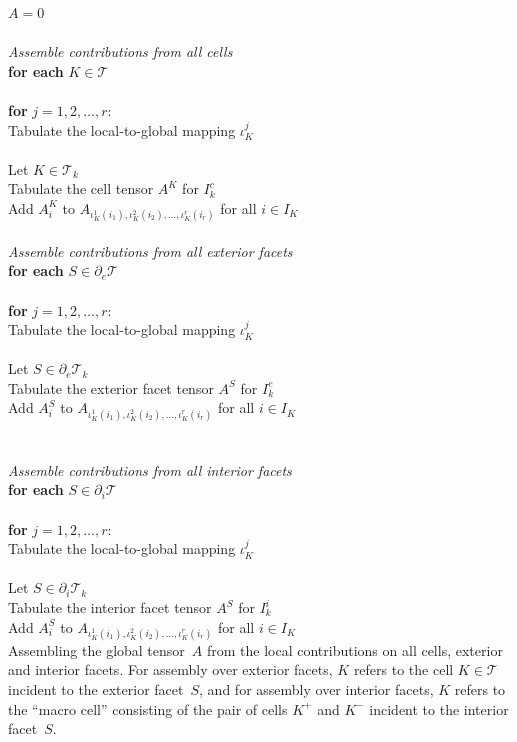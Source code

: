 \begin{algorithm}
$A = 0$ \\
\\
\emph{Assemble contributions from all cells} \\
\textbf{for each} $K \in \mathcal{T}$ \\
\\
\tab \textbf{for} $j = 1,2,\ldots,r$: \\
\tab\tab Tabulate the local-to-global mapping $\iota_K^j$ \\
\\
\tab Let $K \in \mathcal{T}_k$ \\
\tab Tabulate the cell tensor $A^K$ for $I^c_k$ \\
\tab Add $A^K_i$ to $A_{\iota_K^1(i_1), \iota_K^2(i_2), \ldots, \iota_K^r(i_r)}$ for all $i\in I_K$ \\
\\
\emph{Assemble contributions from all exterior facets} \\
\textbf{for each} $S \in \partial_e\mathcal{T}$ \\
\\
\tab \textbf{for} $j = 1,2,\ldots,r$: \\
\tab\tab Tabulate the local-to-global mapping $\iota_K^j$ \\
\\
\tab Let $S \in \partial_e\mathcal{T}_k$ \\
\tab Tabulate the exterior facet tensor $A^S$ for $I^e_k$ \\
\tab Add $A^S_i$ to $A_{\iota_K^1(i_1), \iota_K^2(i_2), \ldots, \iota_K^r(i_r)}$ for all $i\in I_K$ \\
\\
\\
\emph{Assemble contributions from all interior facets} \\
\textbf{for each} $S \in \partial_i\mathcal{T}$ \\
\\
\tab \textbf{for} $j = 1,2,\ldots,r$: \\
\tab\tab Tabulate the local-to-global mapping $\iota_K^j$ \\
\\
\tab Let $S \in \partial_i\mathcal{T}_k$ \\
\tab Tabulate the interior facet tensor $A^S$ for $I^i_k$ \\
\tab Add $A^S_i$ to $A_{\iota_K^1(i_1), \iota_K^2(i_2), \ldots, \iota_K^r(i_r)}$ for all $i\in I_K$ \\
\caption{Assembling the global tensor~$A$ from the local contributions
  on all cells, exterior and interior facets. For assembly over
  exterior facets, $K$ refers to the cell $K\in\mathcal{T}$ incident
  to the exterior facet~$S$, and for assembly over interior facets,
  $K$ refers to the ``macro cell'' consisting of the pair of cells
  $K^+$ and $K^-$ incident to the interior facet~$S$.}
\label{alg:assembly}
\end{algorithm}
